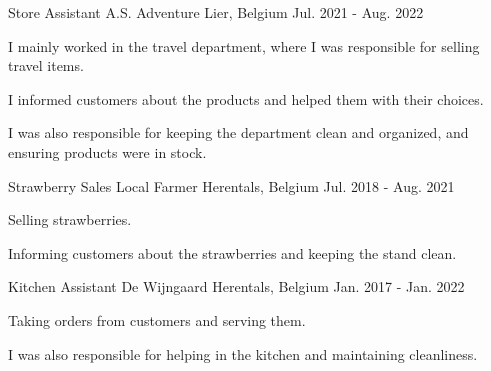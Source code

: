 
\begin{cventries}

    \cventry
      {Store Assistant} %
      {A.S. Adventure} %
      {Lier, Belgium} %
      {Jul. 2021 - Aug. 2022} %
      {
        \begin{cvitems} %
          \item {I mainly worked in the travel department, where I was responsible for selling travel items.}
          \item {I informed customers about the products and helped them with their choices.}
          \item {I was also responsible for keeping the department clean and organized, and ensuring products were in stock.}
        \end{cvitems}
      }

    \cventry
      {Strawberry Sales} %
      {Local Farmer} %
      {Herentals, Belgium} %
      {Jul. 2018 - Aug. 2021} %
      {
        \begin{cvitems} %
          \item {Selling strawberries.}
          \item {Informing customers about the strawberries and keeping the stand clean.}
        \end{cvitems}
      }

    \cventry
      {Kitchen Assistant} %
      {De Wijngaard} %
      {Herentals, Belgium} %
      {Jan. 2017 - Jan. 2022} %
      {
        \begin{cvitems} %
          \item {Taking orders from customers and serving them.}
          \item {I was also responsible for helping in the kitchen and maintaining cleanliness.}
        \end{cvitems}
      }

\end{cventries}
